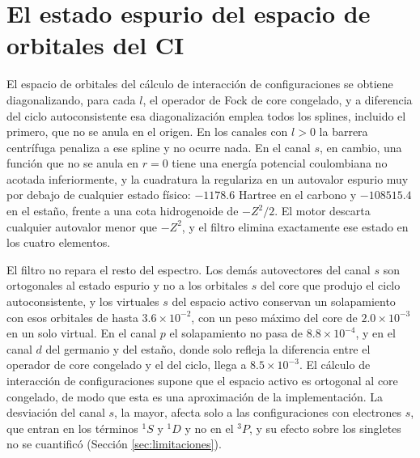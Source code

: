 
\section{El estado espurio del espacio de orbitales del CI}
\label{sec:estado_espurio}

El espacio de orbitales del cálculo de interacción de configuraciones se obtiene diagonalizando, para cada $l$, el operador de Fock de core congelado, y a diferencia del ciclo autoconsistente esa diagonalización emplea todos los splines, incluido el primero, que no se anula en el origen. En los canales con $l > 0$ la barrera centrífuga penaliza a ese spline y no ocurre nada. En el canal $s$, en cambio, una función que no se anula en $r = 0$ tiene una energía potencial coulombiana no acotada inferiormente, y la cuadratura la regulariza en un autovalor espurio muy por debajo de cualquier estado físico: $-1178.6$ Hartree en el carbono y $-108515.4$ en el estaño, frente a una cota hidrogenoide de $-Z^2/2$. El motor descarta cualquier autovalor menor que $-Z^2$, y el filtro elimina exactamente ese estado en los cuatro elementos.

El filtro no repara el resto del espectro. Los demás autovectores del canal $s$ son ortogonales al estado espurio y no a los orbitales $s$ del core que produjo el ciclo autoconsistente, y los virtuales $s$ del espacio activo conservan un solapamiento con esos orbitales de hasta $3.6\times10^{-2}$, con un peso máximo del core de $2.0\times10^{-3}$ en un solo virtual. En el canal $p$ el solapamiento no pasa de $8.8\times10^{-4}$, y en el canal $d$ del germanio y del estaño, donde solo refleja la diferencia entre el operador de core congelado y el del ciclo, llega a $8.5\times10^{-3}$. El cálculo de interacción de configuraciones supone que el espacio activo es ortogonal al core congelado, de modo que esta es una aproximación de la implementación. La desviación del canal $s$, la mayor, afecta solo a las configuraciones con electrones $s$, que entran en los términos $^1S$ y $^1D$ y no en el $^3P$, y su efecto sobre los singletes no se cuantificó (Sección \ref{sec:limitaciones}).
